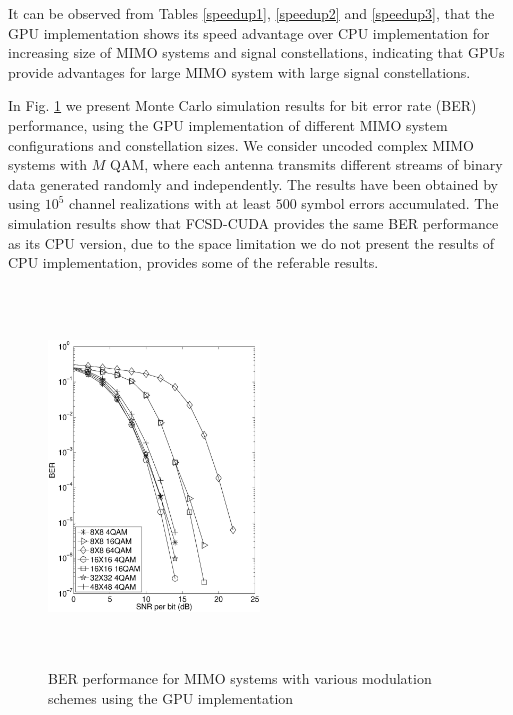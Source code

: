 \documentclass[letterpaper, 10pt, conference,twoside]{ieeeconf}
\begin{document}
It can be observed from Tables \ref{speedup1}, \ref{speedup2} and \ref{speedup3}, that the GPU implementation shows its speed advantage over CPU implementation for increasing size of MIMO systems and signal constellations, indicating that GPUs provide advantages for large MIMO system with large signal constellations.

In Fig. \ref{BER curve} we present Monte Carlo simulation results for bit error rate (BER) performance, using the GPU implementation of different MIMO system configurations and constellation sizes. We consider uncoded complex MIMO systems with $M$ QAM, where each antenna transmits different streams of binary data generated randomly and independently. The results have been obtained by using $10^{5}$ channel realizations with at least $500$ symbol errors accumulated. The simulation results show that FCSD-CUDA provides the same BER performance as its CPU version, due to the space limitation we do not present the results of CPU implementation, \cite{barbero2008fixing} provides some of the referable results.
\begin{figure}[htb]
\centering
\includegraphics*[width=0.5\textwidth, height=10cm]{BER_curves.eps}
\caption{BER performance for MIMO systems with various modulation schemes using the GPU implementation}
\label{BER curve}
\end{figure}
\end{document}
